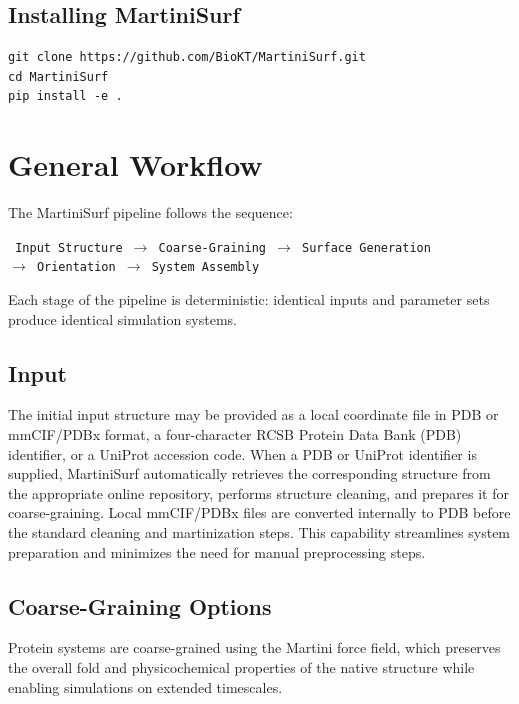 \documentclass[11pt]{article}
\begin{document}
\subsection{Installing MartiniSurf}

\begin{lstlisting}
git clone https://github.com/BioKT/MartiniSurf.git
cd MartiniSurf
pip install -e .
\end{lstlisting}

\section{General Workflow}

The MartiniSurf pipeline follows the sequence:

\begin{center}
\texttt{
Input Structure $\rightarrow$ Coarse-Graining $\rightarrow$ Surface Generation\\
$\rightarrow$ Orientation $\rightarrow$ System Assembly
}
\end{center}

Each stage of the pipeline is deterministic: identical inputs and parameter sets produce identical simulation systems.

\subsection{Input}

The initial input structure may be provided as a local coordinate file in
PDB or mmCIF/PDBx format, a four-character RCSB Protein Data Bank (PDB)
identifier, or a UniProt accession code.
When a PDB or UniProt identifier is supplied, MartiniSurf automatically retrieves
the corresponding structure from the appropriate online repository, performs
structure cleaning, and prepares it for coarse-graining.
Local mmCIF/PDBx files are converted internally to PDB before the standard
cleaning and martinization steps.
This capability streamlines system preparation and minimizes the need for manual
preprocessing steps.

\subsection{Coarse-Graining Options}

Protein systems are coarse-grained using the Martini force field, which preserves
the overall fold and physicochemical properties of the native structure while
enabling simulations on extended timescales.
\end{document}
